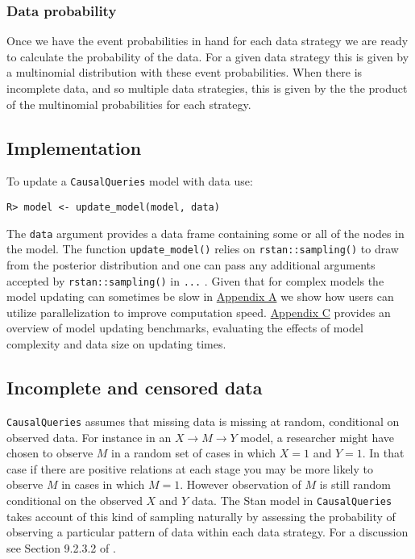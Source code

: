 \documentclass[
  11pt,
  article]{jss}
\begin{document}
\hypertarget{data-probability}{%
\subsubsection{Data probability}\label{data-probability}}

Once we have the event probabilities in hand for each data strategy we
are ready to calculate the probability of the data. For a given data
strategy this is given by a multinomial distribution with these event
probabilities. When there is incomplete data, and so multiple data
strategies, this is given by the the product of the multinomial
probabilities for each strategy.

\hypertarget{implementation}{%
\subsection{Implementation}\label{implementation}}

To update a \texttt{CausalQueries} model with data use:

\begin{verbatim}
R> model <- update_model(model, data)
\end{verbatim}

The \texttt{data} argument provides a data frame containing some or all
of the nodes in the model. The function \texttt{update\_model()} relies
on \texttt{rstan::sampling()} to draw from the posterior distribution
and one can pass any additional arguments accepted by
\texttt{rstan::sampling()} in \texttt{...} . Given that for complex
models the model updating can sometimes be slow in
\protect\hyperlink{sec-parallel}{Appendix A} we show how users can
utilize parallelization to improve computation speed.
\protect\hyperlink{sec-benchmark}{Appendix C} provides an overview of
model updating benchmarks, evaluating the effects of model complexity
and data size on updating times.

\hypertarget{incomplete-and-censored-data}{%
\subsection{Incomplete and censored
data}\label{incomplete-and-censored-data}}

\texttt{CausalQueries} assumes that missing data is missing at random,
conditional on observed data. For instance in an
\(X \rightarrow M \rightarrow Y\) model, a researcher might have chosen
to observe \(M\) in a random set of cases in which \(X=1\) and \(Y=1\).
In that case if there are positive relations at each stage you may be
more likely to observe \(M\) in cases in which \(M=1\). However
observation of \(M\) is still random conditional on the observed \(X\)
and \(Y\) data. The Stan model in \texttt{CausalQueries} takes account
of this kind of sampling naturally by assessing the probability of
observing a particular pattern of data within each data strategy. For a
discussion see Section 9.2.3.2 of \citet{humphreys_integrated_2023}.
\end{document}
